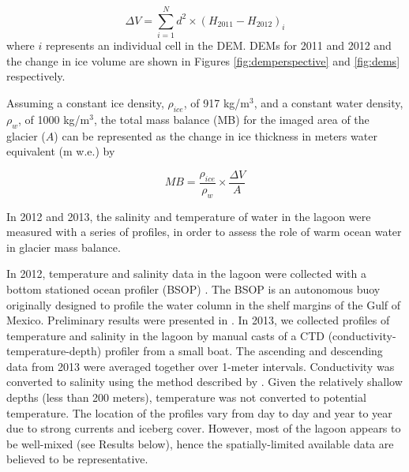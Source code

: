 \documentclass[review]{igs}
\begin{document}
\begin{equation}\Delta V=\sum\limits_{i=1}^N d^2 \times (H_{2011}-H_{2012})_i\end{equation} where $i$ represents an individual cell in the DEM. DEMs for 2011 and 2012 and the change in ice volume are shown in Figures \ref{fig:demperspective} and \ref{fig:dems} respectively.
 
Assuming a constant ice density, $\rho_{ice}$, of 917 kg/m$^3$, and a constant water density, $\rho_{w}$, of 1000 kg/m$^3$, the total mass balance (MB) for the imaged area of the glacier ($A$) can be represented as the change in ice thickness in meters water equivalent (m w.e.) by
  
\begin{equation}MB=\frac{\rho_{ice}}{\rho_w} \times \frac{\Delta V}{A}\end{equation}
 

In 2012 and 2013, the salinity and temperature of water in the lagoon were measured with a series of profiles, in order to assess the role of warm ocean water in glacier mass balance. 

In 2012, temperature and salinity data in the lagoon were collected with a bottom stationed ocean profiler (BSOP) \citep{langebrake2002design}. The BSOP is an autonomous buoy originally designed to profile the water column in the shelf margins of the Gulf of Mexico. Preliminary results were presented in \citet{DIXONEOS}. In 2013, we collected profiles of temperature and salinity in the lagoon by manual casts of a CTD (conductivity-temperature-depth) profiler from a small boat.
The ascending and descending data from 2013 were averaged together over 1-meter intervals. Conductivity was converted to salinity using the method described by \citet{fofonoff1983algorithms}.  Given the relatively shallow depths (less than 200 meters), temperature was not converted to potential temperature.  The location of the profiles vary from day to day and year to year due to strong currents and iceberg cover.  However, most of the lagoon appears to be well-mixed (see Results below), hence the spatially-limited available data are believed to be representative. 
\end{document}
